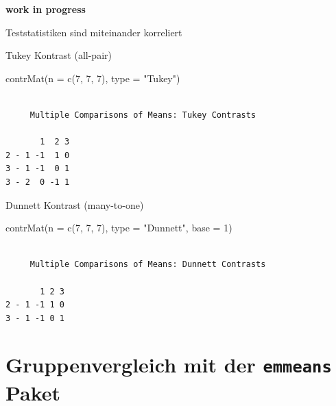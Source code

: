 \documentclass[
  letterpaper,
  DIV=11,
  oneside]{scrreport}
\newenvironment{Shaded}{\begin{snugshade}}{\end{snugshade}}
\newcommand{\AttributeTok}[1]{\textcolor[rgb]{0.40,0.45,0.13}{#1}}
\newcommand{\DecValTok}[1]{\textcolor[rgb]{0.68,0.00,0.00}{#1}}
\newcommand{\FunctionTok}[1]{\textcolor[rgb]{0.28,0.35,0.67}{#1}}
\newcommand{\NormalTok}[1]{\textcolor[rgb]{0.00,0.23,0.31}{#1}}
\newcommand{\StringTok}[1]{\textcolor[rgb]{0.13,0.47,0.30}{#1}}
\begin{document}
\textbf{work in progress}

Teststatistiken sind miteinander korreliert

Tukey Kontrast (all-pair)

\begin{Shaded}
\begin{Highlighting}[]
\FunctionTok{contrMat}\NormalTok{(}\AttributeTok{n =} \FunctionTok{c}\NormalTok{(}\DecValTok{7}\NormalTok{, }\DecValTok{7}\NormalTok{, }\DecValTok{7}\NormalTok{), }\AttributeTok{type =} \StringTok{"Tukey"}\NormalTok{)}
\end{Highlighting}
\end{Shaded}

\begin{verbatim}

     Multiple Comparisons of Means: Tukey Contrasts

       1  2 3
2 - 1 -1  1 0
3 - 1 -1  0 1
3 - 2  0 -1 1
\end{verbatim}

Dunnett Kontrast (many-to-one)

\begin{Shaded}
\begin{Highlighting}[]
\FunctionTok{contrMat}\NormalTok{(}\AttributeTok{n =} \FunctionTok{c}\NormalTok{(}\DecValTok{7}\NormalTok{, }\DecValTok{7}\NormalTok{, }\DecValTok{7}\NormalTok{), }\AttributeTok{type =} \StringTok{"Dunnett"}\NormalTok{, }\AttributeTok{base =} \DecValTok{1}\NormalTok{)}
\end{Highlighting}
\end{Shaded}

\begin{verbatim}

     Multiple Comparisons of Means: Dunnett Contrasts

       1 2 3
2 - 1 -1 1 0
3 - 1 -1 0 1
\end{verbatim}

\hypertarget{sec-posthoc-emmeans}{%
\section{\texorpdfstring{Gruppenvergleich mit der \texttt{emmeans}
Paket}{Gruppenvergleich mit der emmeans Paket}}\label{sec-posthoc-emmeans}}

\end{document}
